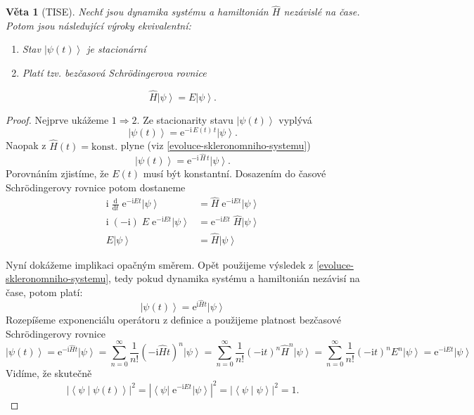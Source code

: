 \documentclass[10pt,a4paper]{article}
\newtheorem{theorem}{Věta}[section]
\theoremstyle{definition}
\newcommand{\const}[1]{\mathrm{#1}}
\newcommand{\abs}[1]{\left| #1 \right|}
\newcommand{\dd}[2]{\frac{\const{d} #1}{\const{d} #2} \;}
\newcommand{\bra}[1]{\left< #1 \right|}
\newcommand{\ket}[1]{\left| #1 \right>}
\newcommand{\braket}[2]{\left< #1 \middle| #2 \right>}
\newcommand{\e}[1]{\const{e}^{#1}}
\renewcommand{\i}{\const{i}}
\def\konst{\mathrm{konst.}}
\begin{document}
\begin{theorem}[TISE]
    Nechť jsou dynamika systému a hamiltonián $\hat H$ nezávislé na čase. Potom jsou následující výroky ekvivalentní:
    \begin{enumerate}
        \item Stav $\ket{\psi(t)}$ je stacionární
        \item Platí tzv. bezčasová Schrödingerova rovnice
    \end{enumerate}
    \begin{equation*}
        \hat{H} \ket{\psi} = E \ket{\psi}.
    \end{equation*}
\end{theorem}
\begin{proof}
    Nejprve ukážeme $1 \Rightarrow 2$. Ze stacionarity stavu $\ket{\psi(t)}$ vyplývá
    \begin{equation*}
        \ket{\psi(t)} = \e{-\i \, E(t) \, t} \ket{\psi}.
    \end{equation*}
    Naopak z $\hat H(t) = \konst$ plyne (viz \ref{evoluce-skleronomniho-systemu})
    \begin{equation*}
        \ket{\psi(t)} = \e{-\i \, \hat H \, t} \ket{\psi}.
    \end{equation*}
    Porovnáním zjistíme, že $E(t)$ musí být konstantní. Dosazením do časové Schrödingerovy rovnice potom dostaneme
    \begin{align*}
        \i \; \dd{}{t} \! \e{-\i E t} \ket{\psi}
        &= \hat H \; \e{-\i E t} \ket{\psi}
        \\
        \i \; (-\i) \; E \; \e{-\i E t} \ket{\psi}
        &= \e{-\i E t} \; \hat H \ket{\psi}
        \\
        E \ket{\psi}
        &= \hat H \ket{\psi}
    \end{align*}

    Nyní dokážeme implikaci opačným směrem. Opět použijeme výsledek z \ref{evoluce-skleronomniho-systemu}, tedy pokud dynamika systému a hamiltonián nezávisí na čase, potom platí:
    \begin{equation*}
        \ket{\psi(t)} = \e{\i \hat H t} \ket{\psi}
    \end{equation*}
    Rozepíšeme exponenciálu operátoru z definice a použijeme platnost bezčasové Schrödingerovy rovnice
    \begin{equation*}
        \ket{\psi(t)}
        = \e{-\i \hat H t} \ket{\psi}
        = \sum_{n = 0}^\infty \frac{1}{n!} (-\i \hat H t)^n \ket{\psi}
        = \sum_{n = 0}^\infty \frac{1}{n!} (-\i t)^n \hat H^n \ket{\psi}
        = \sum_{n = 0}^\infty \frac{1}{n!}(-\i t)^n E^n \ket{\psi}
        = \e{-\i E t} \ket{\psi}
    \end{equation*}
    Vidíme, že skutečně
    \begin{equation*}
        \abs{\braket{\psi}{\psi(t)}}^2
        = \abs{\bra{\psi} \; \e{-\i E t} \ket{\psi}}^2
        = \abs{\braket{\psi}{\psi}}^2
        = 1.
    \end{equation*}
\end{proof}
\end{document}
